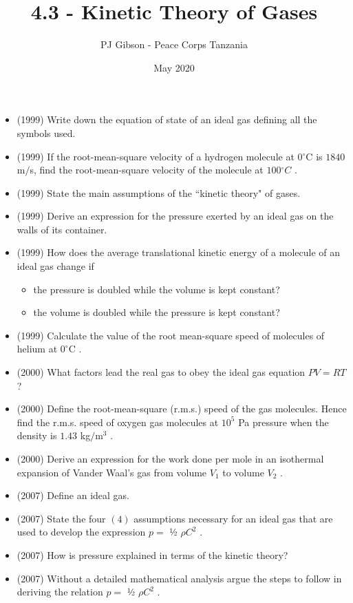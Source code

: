\documentclass{article}
\title{\textbf{4.3 - Kinetic Theory of Gases}}
\author{PJ Gibson - Peace Corps Tanzania}
\date{May 2020}
\begin{document}
\maketitle

\begin{itemize}
\item (1999)  Write down the equation of state of an ideal gas defining all the symbols used.
\item (1999)  If the root-mean-square velocity of a hydrogen molecule at $ 0​ ^{\circ}$C is $ 1840$ m$/$s, find the root-mean-square velocity of the molecule at $ 100​ ^{\circ}$ ​ $ C$ .
\item (1999)  State the main assumptions of the “kinetic theory" of gases.
\item (1999)  Derive an expression for the pressure exerted by an ideal gas on the walls of its container.
\item (1999)  How does the average translational kinetic energy of a molecule of an ideal gas change if
 \begin{itemize}
\item the pressure is doubled while the volume is kept constant?
\item the volume is doubled while the pressure is kept constant?
\end{itemize}
\item (1999)  Calculate the value of the root mean-square speed of molecules of helium at $ 0^{\circ}$C .
\item (2000)  What factors lead the real gas to obey the ideal gas equation $ PV = RT$ ?
\item (2000)  Define the root-mean-square (r.m.s.) speed of the gas molecules. Hence find the r.m.s. speed of oxygen gas molecules at $ 10^{5}$ Pa pressure when the density is $ 1.43$ kg$/$m$ ^{3}$ .
\item (2000)  Derive an expression for the work done per mole in an isothermal expansion of Vander Waal’s gas from volume $ V_{1}$ to volume $ V_{2}$ .
\item (2007)  Define an ideal gas.
\item (2007)  State the four $ (4)$ assumptions necessary for an ideal gas that are used to develop the expression $ p=$ ½ $ \rho C^{2}$ .
\item (2007)  How is pressure explained in terms of the kinetic theory? 
\item (2007)  Without a detailed mathematical analysis argue the steps to follow in deriving the relation $ p=$ ½ $ \rho C^{2}$ .

\end{itemize}
\end{document}
